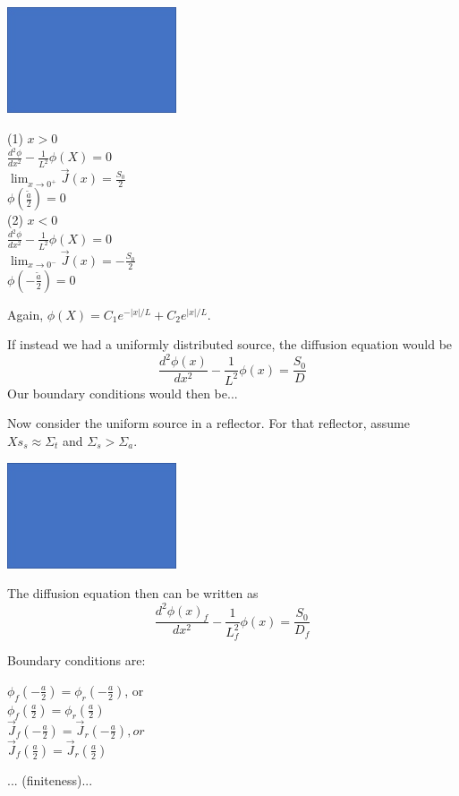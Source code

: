 \documentclass{report}
\newcommand{\tab}{\-\hspace{1cm}}
\newcommand{\Xs}{\Sigma}
\newcommand{\cur}{\vec{J}}
\begin{document}
\includegraphics[width=5cm]{inf_slab_vacuum}

\begin{multicols}{2}
(1) $x>0$ \\
	\tab $\frac{d^2\phi}{dx^2} - \frac{1}{L^2}\phi(X) = 0$ \\
	\tab $\lim_{x\rightarrow0^+}\cur(x) = \frac{S_0}{2}$ \\
	\tab $\phi(\frac{\tilde{a}}{2})=0$ \\
	
(2) $x<0$ \\
	\tab $\frac{d^2\phi}{dx^2} - \frac{1}{L^2}\phi(X) = 0$ \\
	\tab $\lim_{x\rightarrow0^-}\cur(x) = -\frac{S_0}{2}$ \\
	\tab $\phi(-\frac{\tilde{a}}{2})=0$ \\
\end{multicols}

Again, $\phi(X) = C_1 e^{-|x|/L} + C_2e^{|x|/L}$.

If instead we had a uniformly distributed source, the diffusion equation would be
$$\frac{d^2\phi(x)}{dx^2} - \frac{1}{L^2}\phi(x) = \frac{S_0}{D}$$
Our boundary conditions would then be...


Now consider the uniform source in a reflector. For that reflector, assume $Xs_s \approx \Xs_t$ and $\Xs_s > \Xs_a$.

\includegraphics[width=5cm]{unif_slab_reflector}

The diffusion equation then can be written as
$$\frac{d^2\phi(x)_f}{dx^2} - \frac{1}{L_f^2}\phi(x) = \frac{S_0}{D_f}$$

Boundary conditions are:\\
\begin{multicols}{2}
	\tab $\phi_f(-\frac{a}{2}) = \phi_r(-\frac{a}{2})$, or\\
	\tab $\phi_f(\frac{a}{2}) = \phi_r(\frac{a}{2})$\\
	
	\tab $\cur_f(-\frac{a}{2}) = \cur_r(-\frac{a}{2}), or$\\
	\tab $\cur_f(\frac{a}{2}) = \cur_r(\frac{a}{2})$\\
\end{multicols}
... (finiteness)...
\end{document}
